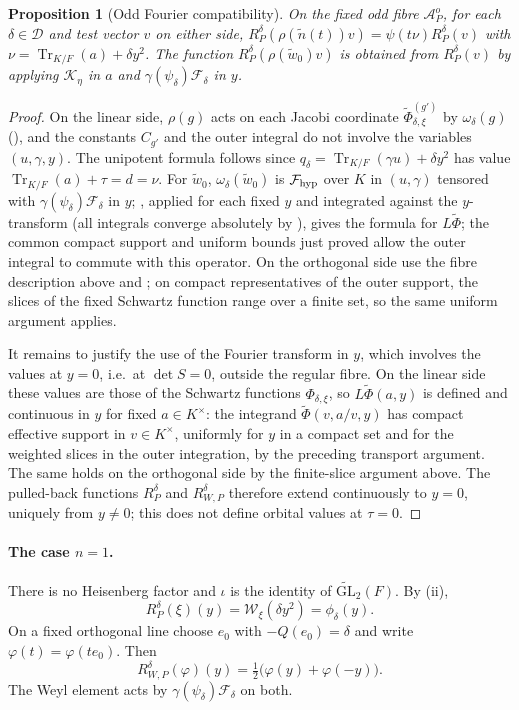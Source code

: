 \documentclass[11pt,oneside,notitlepage]{book}
\numberwithin{equation}{section}
\theoremstyle{plain}
\newtheorem{proposition}[theorem]{Proposition}
\theoremstyle{definition}
\newcommand{\GL}{\mathrm{GL}}
\newcommand{\cW}{\mathcal{W}}
\newcommand{\tGL}{\widetilde{\GL}}
\newcommand{\Tr}{\operatorname{Tr}}
\begin{document}
\begin{proposition}[Odd Fourier compatibility]\label{prop:odd}
	On the fixed odd fibre $\mathcal A_P^o$, for each $\delta\in\mathcal D$ and test vector $v$ on either side, $R_P^\delta(\rho(\tilde n(t))v)=\psi(t\nu)R_P^\delta(v)$ with $\nu=\Tr_{K/F}(a)+\delta y^2$. The function $R_P^\delta(\rho(\tilde w_0)v)$ is obtained from $R_P^\delta(v)$ by applying $\mathcal K_\eta$ in $a$ and $\gamma(\psi_\delta)\mathcal F_\delta$ in $y$.
\end{proposition}
\begin{proof}
	On the linear side, $\rho(g)$ acts on each Jacobi coordinate $\tilde\Phi^{(g')}_{\delta,\xi}$ by $\omega_\delta(g)$ (), and the constants $C_{g'}$ and the outer integral do not involve the variables $(u,\gamma,y)$. The unipotent formula follows since $q_\delta=\Tr_{K/F}(\gamma u)+\delta y^2$ has value $\Tr_{K/F}(a)+\tau =d=\nu$. For $\tilde w_0$, $\omega_\delta(\tilde w_0)$ is $\mathcal F_{\rm hyp}$ over $K$ in $(u,\gamma)$ tensored with $\gamma(\psi_\delta)\mathcal F_\delta$ in $y$; , applied for each fixed $y$ and integrated against the $y$-transform (all integrals converge absolutely by ), gives the formula for $L\tilde\Phi$; the common compact support and uniform bounds just proved allow the outer integral to commute with this operator. On the orthogonal side use the fibre description above and ; on compact representatives of the outer support, the slices of the fixed Schwartz function range over a finite set, so the same uniform argument applies.
	
	It remains to justify the use of the Fourier transform in $y$, which involves the values at $y=0$, i.e.\ at $\det S=0$, outside the regular fibre. On the linear side these values are those of the Schwartz functions $\Phi_{\delta,\xi}$, so $L\tilde\Phi(a,y)$ is defined and continuous in $y$ for fixed $a\in K^\times$: the integrand $\tilde\Phi(v,a/v,y)$ has compact effective support in $v\in K^\times$, uniformly for $y$ in a compact set and for the weighted slices in the outer integration, by the preceding transport argument. The same holds on the orthogonal side by the finite-slice argument above. The pulled-back functions $R_P^\delta$ and $R_{W,P}^\delta$ therefore extend continuously to $y=0$, uniquely from $y\ne0$; this does not define orbital values at $\tau=0$.
\end{proof}

\paragraph{The case $n=1$.} There is no Heisenberg factor and $\iota$ is the identity of $\tGL_2(F)$. By (ii),
\[
R_P^\delta(\xi)(y)=\cW_\xi(\delta y^2)=\phi_\delta(y).
\]
On a fixed orthogonal line choose $e_0$ with $-Q(e_0)=\delta$ and write $\varphi(t)=\varphi(te_0)$. Then
\[
R_{W,P}^\delta(\varphi)(y)=\tfrac12\bigl(\varphi(y)+\varphi(-y)\bigr).
\]
The Weyl element acts by $\gamma(\psi_\delta)\mathcal F_\delta$ on both.
\end{document}
